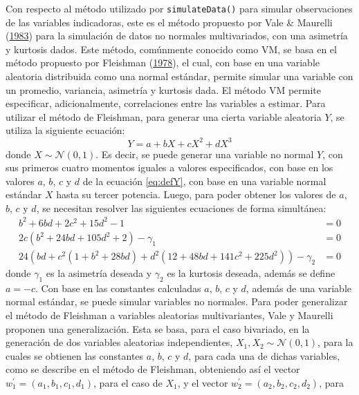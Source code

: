 \documentclass[
  english]{revcoles}
\begin{document}
Con respecto al método utilizado por \texttt{simulateData()} para
simular observaciones de las variables indicadoras, este es el método
propuesto por Vale \& Maurelli (\protect\hyperlink{ref-Vale1983}{1983})
para la simulación de datos no normales multivariados, con una asimetría
y kurtosis dados. Este método, comúnmente conocido como VM, se basa en
el método propuesto por Fleishman
(\protect\hyperlink{ref-Fleishman1978}{1978}), el cual, con base en una
variable aleatoria distribuida como una normal estándar, permite simular
una variable con un promedio, variancia, asimetría y kurtosis dada. El
método VM permite especificar, adicionalmente, correlaciones entre las
variables a estimar. Para utilizar el método de Fleishman, para generar
una cierta variable aleatoria \(Y\), se utiliza la siguiente ecuación:
\begin{equation} \label{eq:defY}
  Y = a + bX + cX^2 + d X^3
\end{equation} donde \(X \sim \mathcal{N} (0,1)\). Es decir, se puede
generar una variable no normal \(Y\), con sus primeros cuatro momentos
iguales a valores especificados, con base en los valores \(a\), \(b\),
\(c\) y \(d\) de la ecuación \ref{eq:defY}, con base en una variable
normal estándar \(X\) hasta su tercer potencia. Luego, para poder
obtener los valores de \(a\), \(b\), \(c\) y \(d\), se necesitan
resolver las siguientes ecuaciones de forma simultánea: \begin{align*}
  b^2 + 6bd + 2c^2 + 15d^2 -1 & = 0 \\
  2c (b^2 + 24bd + 105d^2 + 2) - \gamma_1 & = 0 \\
  24 \left(bd + c^2 (1 + b^2 + 28bd) + d^2 (12 + 48bd + 141c^2 + 225d^2) \right) - \gamma_2 & = 0
\end{align*} donde \(\gamma_1\) es la asimetría deseada y \(\gamma_2\)
es la kurtosis deseada, además se define \(a = -c\). Con base en las
constantes calculadas \(a\), \(b\), \(c\) y \(d\), además de una
variable normal estándar, se puede simular variables no normales. Para
poder generalizar el método de Fleishman a variables aleatorias
multivariantes, Vale y Maurelli proponen una generalización. Esta se
basa, para el caso bivariado, en la generación de dos variables
aleatorias independientes, \(X_1, X_2 \sim \mathcal{N} (0,1)\), para la
cuales se obtienen las constantes \(a\), \(b\), \(c\) y \(d\), para cada
una de dichas variables, como se describe en el método de Fleishman,
obteniendo así el vector \(w^\prime_1 = (a_1, b_1, c_1, d_1)\), para el
caso de \(X_1\), y el vector \(w^\prime_2 = (a_2, b_2, c_2, d_2)\), para
\end{document}

